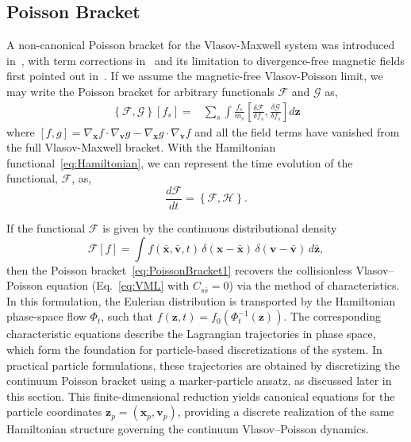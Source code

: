 \documentclass[preprint,12pt]{elsarticle}
\theoremstyle{definition}
\begin{document}
\subsection{Poisson Bracket}\label{sec:PoissonBracket}
A non-canonical Poisson bracket for the Vlasov-Maxwell system was introduced in~\cite{Morrison1980}, with term corrections in~\cite{Marsden1982} and its limitation to divergence-free magnetic fields first pointed out in~\cite{Morrison1982}. If we assume the magnetic-free Vlasov-Poisson limit, we may write the Poisson bracket for arbitrary functionals $\mathcal{F}$ and $\mathcal{G}$ as,
\begin{align}\label{eq:PoissonBracket}
  \left\{\mathcal{F},\mathcal{G}\right\} \left[f_s\right] = &\sum_s \int \frac{f_s}{m_s} \left[\frac{\delta \mathcal{F}}{\delta f_s},\frac{\delta \mathcal{G}}{\delta f_s}\right] d\boldsymbol{z}
\end{align}
where $\left[f,g\right] = \nabla_{\boldsymbol{x}} f \cdot \nabla_{\boldsymbol{v}} g - \nabla_{\boldsymbol{x}} g \cdot \nabla_{\boldsymbol{v}} f$ and all the field terms have vanished from the full Vlasov-Maxwell bracket. With the Hamiltonian functional~\eqref{eq:Hamiltonian}, we can represent the time evolution of the functional, $\mathcal{F}$, as,
\begin{equation}
  \frac{d \mathcal{F}}{dt} = \left\{\mathcal{F},\mathcal{H}\right\}.
  \label{eq:PoissonBracket1}
\end{equation}

If the functional $\mathcal{F}$ is given by the continuous distributional density
\begin{equation}
    \mathcal{F}[f] = \int f(\bar{\boldsymbol{x}},\bar{\boldsymbol{v}},t)\, \delta(\boldsymbol{x}-\bar{\boldsymbol{x}})\,\delta(\boldsymbol{v}-\bar{\boldsymbol{v}})\,d\bar{\boldsymbol{z}},
\end{equation}
then the Poisson bracket~\eqref{eq:PoissonBracket1} recovers the collisionless Vlasov–Poisson equation (Eq.~\eqref{eq:VML} with $C_{s\bar{s}}=0$) via the method of characteristics. 
In this formulation, the Eulerian distribution is transported by the Hamiltonian phase-space flow 
\(\Phi_t\), such that \(f(\boldsymbol{z},t)=f_0(\Phi_t^{-1}(\boldsymbol{z}))\). 
The corresponding characteristic equations describe the Lagrangian trajectories in phase space, which form the foundation for particle-based discretizations of the system. 
In practical particle formulations, these trajectories are obtained by discretizing the continuum Poisson bracket using a marker-particle ansatz, as discussed later in this section. 
This finite-dimensional reduction yields canonical equations for the particle coordinates $\boldsymbol{z}_p = (\boldsymbol{x}_p, \boldsymbol{v}_p)$, providing a discrete realization of the same Hamiltonian structure governing the continuum Vlasov–Poisson dynamics.
\end{document}
